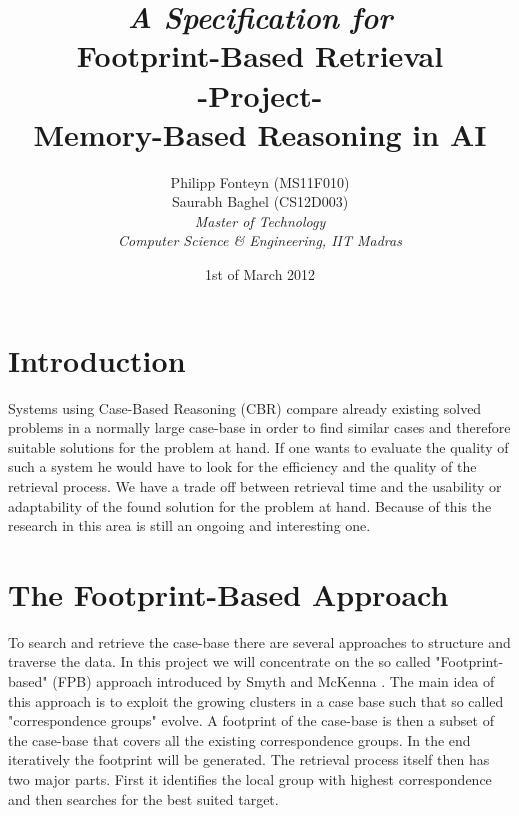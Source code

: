 \documentclass[11pt]{article}
\title{
	\emph{A Specification for}\\
	\huge{\textbf{Footprint-Based Retrieval} }\\
	-Project-\\
	Memory-Based Reasoning in AI\\[2em]	
}
\author{
	Philipp Fonteyn (MS11F010)\\
	Saurabh Baghel (CS12D003)\\[2em]
	\emph{Master of Technology}\\
	\emph{Computer Science \& Engineering, IIT Madras}
}
\date{1st of March 2012}
\begin{document}
\maketitle
\newpage

%
%
%
\section{Introduction}
Systems using Case-Based Reasoning (CBR) compare already existing solved problems in a normally large case-base in order to find similar cases and therefore suitable solutions for the problem at hand. If one wants to evaluate the quality of such a system he would have to look for the efficiency and the quality of the retrieval process. We have a trade off between retrieval time and the usability or adaptability of the found solution for the problem at hand. Because of this the research in this area is still an ongoing and interesting one.
%
%
%
\section{The Footprint-Based Approach}
To search and retrieve the case-base there are several approaches to structure and traverse the data. In this project we will concentrate on the so called "Footprint-based" (FPB) approach introduced by Smyth and McKenna \cite{FPBR}. The main idea of this approach is to exploit the growing clusters in a case base such that so called "correspondence groups" evolve. A footprint of the case-base is then a subset of the case-base that covers all the existing correspondence groups. In the end iteratively the footprint will be generated. The retrieval process itself then has two major parts. First it identifies the local group with highest correspondence and then searches for the best suited target. 

%
%
%
\end{document}
